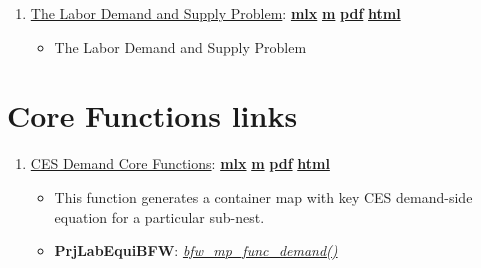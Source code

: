 \documentclass[
]{book}
\providecommand{\tightlist}{%
  \setlength{\itemsep}{0pt}\setlength{\parskip}{0pt}}
\begin{document}
\begin{enumerate}
\def\labelenumi{\arabic{enumi}.}
\tightlist
\item
  \href{https://fanwangecon.github.io/PrjLabEquiBFW/PrjLabEquiBFW/doc/intro/htmlpdfm/bfwx_intro.html}{The Labor Demand and Supply Problem}: \href{https://github.com/FanWangEcon/PrjLabEquiBFW/blob/main/PrjLabEquiBFW/doc/intro/bfwx_intro.mlx}{\textbf{mlx}} \textbar{} \href{https://github.com/FanWangEcon/PrjLabEquiBFW/blob/main/PrjLabEquiBFW/doc/intro/htmlpdfm/bfwx_intro.m}{\textbf{m}} \textbar{} \href{https://github.com/FanWangEcon/PrjLabEquiBFW/blob/main/PrjLabEquiBFW/doc/intro/htmlpdfm/bfwx_intro.pdf}{\textbf{pdf}} \textbar{} \href{https://fanwangecon.github.io/PrjLabEquiBFW/PrjLabEquiBFW/doc/intro/htmlpdfm/bfwx_intro.html}{\textbf{html}}

  \begin{itemize}
  \tightlist
  \item
    The Labor Demand and Supply Problem
  \end{itemize}
\end{enumerate}

\hypertarget{core-functions-links}{%
\section{Core Functions links}\label{core-functions-links}}

\begin{enumerate}
\def\labelenumi{\arabic{enumi}.}
\tightlist
\item
  \href{https://fanwangecon.github.io/PrjLabEquiBFW/PrjLabEquiBFW/doc/func/htmlpdfm/bfwx_mp_func_demand.html}{CES Demand Core Functions}: \href{https://github.com/FanWangEcon/PrjLabEquiBFW/blob/main/PrjLabEquiBFW/doc/func/bfwx_mp_func_demand.mlx}{\textbf{mlx}} \textbar{} \href{https://github.com/FanWangEcon/PrjLabEquiBFW/blob/main/PrjLabEquiBFW/doc/func/htmlpdfm/bfwx_mp_func_demand.m}{\textbf{m}} \textbar{} \href{https://github.com/FanWangEcon/PrjLabEquiBFW/blob/main/PrjLabEquiBFW/doc/func/htmlpdfm/bfwx_mp_func_demand.pdf}{\textbf{pdf}} \textbar{} \href{https://fanwangecon.github.io/PrjLabEquiBFW/PrjLabEquiBFW/doc/func/htmlpdfm/bfwx_mp_func_demand.html}{\textbf{html}}

  \begin{itemize}
  \tightlist
  \item
    This function generates a container map with key CES demand-side equation for a particular sub-nest.
  \item
    \textbf{PrjLabEquiBFW}: \emph{\href{https://github.com/FanWangEcon/PrjLabEquiBFW/blob/main/PrjLabEquiBFW/func/bfw_mp_func_demand.m}{bfw\_mp\_func\_demand()}}
  \end{itemize}
\end{enumerate}
\end{document}
